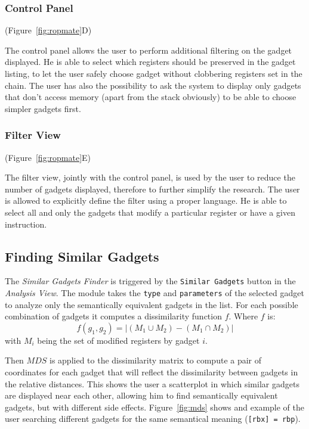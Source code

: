 \documentclass[twocolumn, 11pt]{article}
\begin{document}
\subsubsection{Control Panel}
(Figure~\ref{fig:ropmate}D)

The control panel allows the user to perform additional filtering on the gadget displayed. He is able to select which registers should be preserved in the gadget listing, to let the user safely choose gadget without clobbering registers set in the chain. The user has also the possibility to ask the system to display only gadgets that don't access memory (apart from the stack obviously) to be able to choose simpler gadgets first.

\subsubsection{Filter View}
(Figure~\ref{fig:ropmate}E)

The filter view, jointly with the control panel, is used by the user to reduce the number of gadgets displayed, therefore to further simplify the research. The user is allowed to explicitly define the filter using a proper language. He is able to select all and only the gadgets that modify a particular register or have a given instruction.

\subsection{Finding Similar Gadgets}
The \textit{Similar Gadgets Finder} is triggered by the \texttt{Similar Gadgets} button in the \textit{Analysis View}. The module takes the \texttt{type} and \texttt{parameters} of the selected gadget to analyze only the semantically equivalent gadgets in the list. For each possible combination of gadgets it computes a dissimilarity function $f$. Where $f$ is:
$$
f(g_1, g_2) = |(M_1 \cup M_2) - (M_1 \cap M_2)|
$$
with $M_i$ being the set of modified registers by gadget $i$.

Then $MDS$ is applied to the dissimilarity matrix to compute a pair of coordinates for each gadget that will reflect the dissimilarity between gadgets in the relative distances. This shows the user a scatterplot in which similar gadgets are displayed near each other, allowing him to find semantically equivalent gadgets, but with different side effects. Figure~\ref{fig:mds} shows and example of the user searching different gadgets for the same semantical meaning (\texttt{[rbx] = rbp}).
\end{document}
